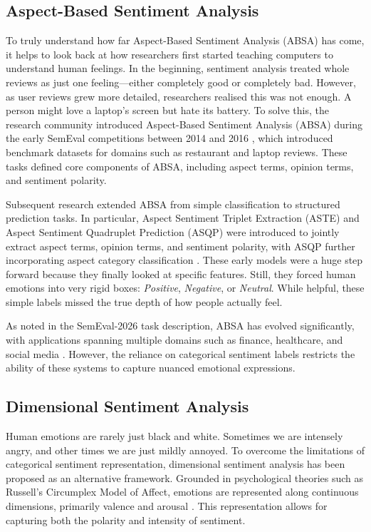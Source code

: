 \documentclass{article}
\begin{document}
\subsection{Aspect-Based Sentiment Analysis}

To truly understand how far Aspect-Based Sentiment Analysis (ABSA) has come, it helps to look back at how researchers first started teaching computers to understand human feelings. In the beginning, sentiment analysis treated whole reviews as just one feeling—either completely good or completely bad. However, as user reviews grew more detailed, researchers realised this was not enough. A person might love a laptop's screen but hate its battery. To solve this, the research community introduced Aspect-Based Sentiment Analysis (ABSA) during the early SemEval competitions between 2014 and 2016 \cite{pontiki2014semeval, pontiki2015semeval, pontiki2016semeval}, which introduced benchmark datasets for domains such as restaurant and laptop reviews. These tasks defined core components of ABSA, including aspect terms, opinion terms, and sentiment polarity.

Subsequent research extended ABSA from simple classification to structured prediction tasks. In particular, Aspect Sentiment Triplet Extraction (ASTE) and Aspect Sentiment Quadruplet Prediction (ASQP) were introduced to jointly extract aspect terms, opinion terms, and sentiment polarity, with ASQP further incorporating aspect category classification \cite{peng2020aste, cai2021asqp}. These early models were a huge step forward because they finally looked at specific features. Still, they forced human emotions into very rigid boxes: \textit{Positive}, \textit{Negative}, or \textit{Neutral}. While helpful, these simple labels missed the true depth of how people actually feel.

As noted in the SemEval-2026 task description, ABSA has evolved significantly, with applications spanning multiple domains such as finance, healthcare, and social media \cite{yu2026dimabsa}. However, the reliance on categorical sentiment labels restricts the ability of these systems to capture nuanced emotional expressions.

\subsection{Dimensional Sentiment Analysis}

Human emotions are rarely just black and white. Sometimes we are intensely angry, and other times we are just mildly annoyed. To overcome the limitations of categorical sentiment representation, dimensional sentiment analysis has been proposed as an alternative framework. Grounded in psychological theories such as Russell’s Circumplex Model of Affect, emotions are represented along continuous dimensions, primarily valence and arousal \cite{russell1980circumplex}. This representation allows for capturing both the polarity and intensity of sentiment.
\end{document}
